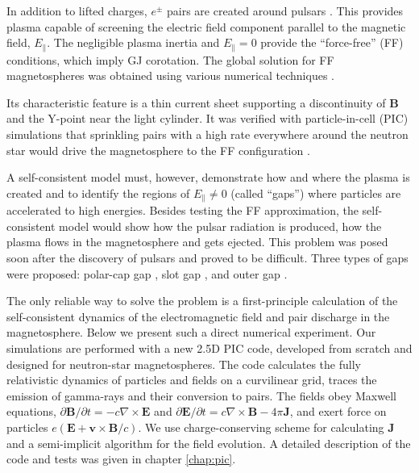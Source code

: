 In addition to lifted charges, $e^\pm$ pairs are created around pulsars
\citep{sturrock_model_1971}.
This provides plasma capable of
screening the electric field component parallel to the magnetic field, $E_\parallel$.
The negligible plasma inertia and $E_\parallel=0$ provide the ``force-free'' (FF)
conditions, which imply GJ corotation.
The global solution for FF magnetospheres was obtained
using various numerical techniques
\citep{contopoulos_axisymmetric_1999,timokhin_force-free_2006,spitkovsky_time-dependent_2006,kalapotharakos_three-dimensional_2009,parfrey_introducing_2012}.

Its characteristic feature is a thin current sheet supporting
a discontinuity of $\mathbf{B}$ and the Y-point near the light cylinder.
It was verified with particle-in-cell (PIC) simulations that
sprinkling pairs with a high rate everywhere around the neutron star
would drive the magnetosphere to the FF configuration \citep{philippov_ab_2014}.

A self-consistent model must, however, demonstrate how and where the plasma is
created and to identify the regions of $E_\parallel\neq 0$ (called ``gaps'')
where particles are accelerated to high energies. Besides testing the FF
approximation, the self-consistent model would show how the pulsar
radiation is produced, how the plasma flows in the magnetosphere and gets ejected.
This problem was posed soon after the discovery of pulsars and proved to be difficult.
Three types of gaps were proposed: polar-cap gap
\citep{sturrock_model_1971,ruderman_theory_1975}, slot gap
\citep{arons_pair_1983, muslimov_high-altitude_2004},
and outer gap
\citep{cheng_energetic_1986}.

The only reliable way to solve the problem is a first-principle calculation of the
self-consistent dynamics of the electromagnetic field and pair discharge in the
magnetosphere. Below we present such a direct numerical experiment.
Our simulations are performed with a new 2.5D PIC code, developed from
scratch and designed for neutron-star magnetospheres.
The code calculates the fully relativistic dynamics of particles and fields
on a curvilinear grid, traces the emission of gamma-rays and their conversion to pairs.
The fields obey Maxwell equations, $\partial\mathbf{B}/\partial t=-c\nabla\times\mathbf{E}$ and
$\partial\mathbf{E}/\partial t=c\nabla\times\mathbf{B} - 4\pi\mathbf{J}$, and exert force on particles
$e(\mathbf{E}+\mathbf{v}\times\mathbf{B}/c)$. We use
\citet{esirkepov_exact_2001}
charge-conserving scheme for calculating $\mathbf{J}$
and a semi-implicit algorithm for the field evolution.
A detailed description of the code and tests was given in chapter \ref{chap:pic}.


